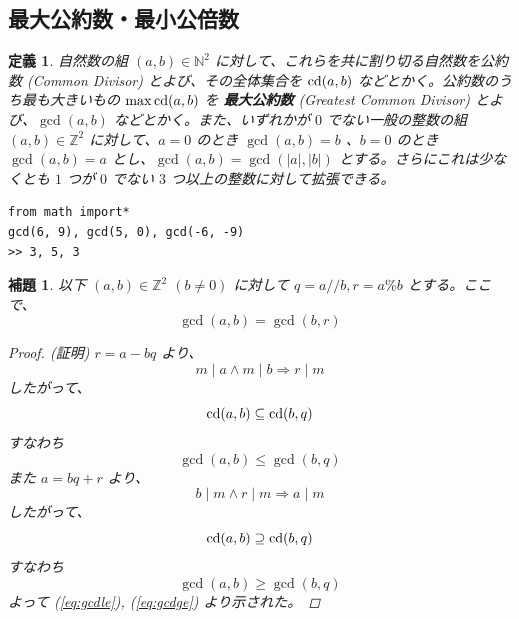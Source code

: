 \documentclass[12pt, a4j]{ltjsarticle}
\newtheorem{lem}[thm]{補題}
\newtheorem{defi}[thm]{定義}
\newcommand*{\cd}{{\rm cd}}
\begin{document}
\subsection{最大公約数・最小公倍数}
\begin{defi}
自然数の組 $(a,b)\in\mathbb{N}^2$ に対して、これらを共に割り切る自然数を公約数 (Common Divisor) とよび、その全体集合を $\cd(a,b)$ などとかく。公約数のうち最も大きいもの $\max \cd(a,b)$ を {\bf 最大公約数} (Greatest Common Divisor) とよび、$\gcd(a,b)$ などとかく。また、いずれかが $0$ でない一般の整数の組 $(a,b)\in\mathbb{Z}^2$ に対して、$a=0$ のとき $\gcd(a,b)=b$ 、$b=0$ のとき $\gcd(a,b)=a$ とし、$\gcd(a,b)=\gcd(|a|,|b|)$ とする。さらにこれは少なくとも $1$ つが $0$ でない $3$ つ以上の整数に対して拡張できる。
\end{defi}
\begin{lstlisting}
from math import*
gcd(6, 9), gcd(5, 0), gcd(-6, -9)
>> 3, 5, 3
\end{lstlisting}
\vspace{1cm}
\begin{lem} 以下 $(a,b)\in\mathbb{Z}^2$ $(b\neq0)$ に対して $q=a//b, r=a\%b$ とする。ここで、\label{gcdabbr}
\begin{equation}\gcd(a,b) = \gcd(b, r)\end{equation}
  \begin{proof}
  (証明) $r = a - bq$ より、
  \begin{equation}
    m \mid a \land m \mid b \Longrightarrow r \mid m
  \end{equation}
  したがって、
  \begin{equation}
    \cd(a, b) \subseteq \cd(b, q)
  \end{equation}
  すなわち
  \begin{equation}
    \gcd(a, b) \le \gcd(b, q) \label{eq:gcdle}
  \end{equation}
  また $a = bq + r$ より、
  \begin{equation}
    b \mid m \land r \mid m \Longrightarrow a \mid m
  \end{equation}
  したがって、
  \begin{equation}
    \cd(a, b) \supseteq \cd(b, q)
  \end{equation}
  すなわち
  \begin{equation}
    \gcd(a, b) \ge \gcd(b, q) \label{eq:gcdge}
  \end{equation}
  よって (\ref{eq:gcdle}), (\ref{eq:gcdge}) より示された。
  \end{proof}
\end{lem}
\end{document}
